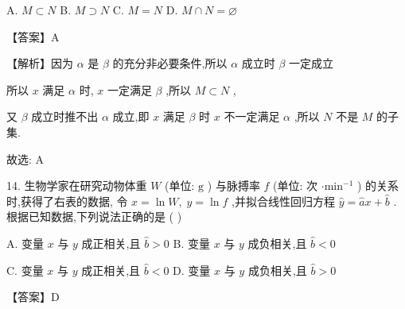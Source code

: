 \documentclass[10pt]{article}
\begin{document}
A. \(M \subset  N\) B. \(M \supset  N\) C. \(M = N\) D. \(M \cap  N = \varnothing\)

【答案】A

【解析】因为 \(\alpha\) 是 \(\beta\) 的充分非必要条件,所以 \(\alpha\) 成立时 \(\beta\) 一定成立

所以 \(x\) 满足 \(\alpha\) 时, \(x\) 一定满足 \(\beta\) ,所以 \(M \subset  N\) ,

又 \(\beta\) 成立时推不出 \(\alpha\) 成立,即 \(x\) 满足 \(\beta\) 时 \(x\) 不一定满足 \(\alpha\) ,所以 \(N\) 不是 \(M\) 的子集.

故选: A

14. 生物学家在研究动物体重 \(W\) (单位: \(\mathrm{g}\) ) 与脉搏率 \(f\) (单位: 次 \(\cdot  {\mathrm{{min}}}^{-1}\) ) 的关系时,获得了右表的数据, 令 \(x = \ln W,\;y = \ln f\) ,并拟合线性回归方程 \(\widehat{y} = \widehat{a}x + \widehat{b}\) . 根据已知数据,下列说法正确的是 ( )

\begin{center}
\end{center}

\begin{center}
\end{center}

A. 变量 \(x\) 与 \(y\) 成正相关,且 \(\widehat{b} > 0\) B. 变量 \(x\) 与 \(y\) 成负相关,且 \(\widehat{b} < 0\)

C. 变量 \(x\) 与 \(y\) 成正相关,且 \(\widehat{b} < 0\) D. 变量 \(x\) 与 \(y\) 成负相关,且 \(\widehat{b} > 0\)

【答案】D
\end{document}

